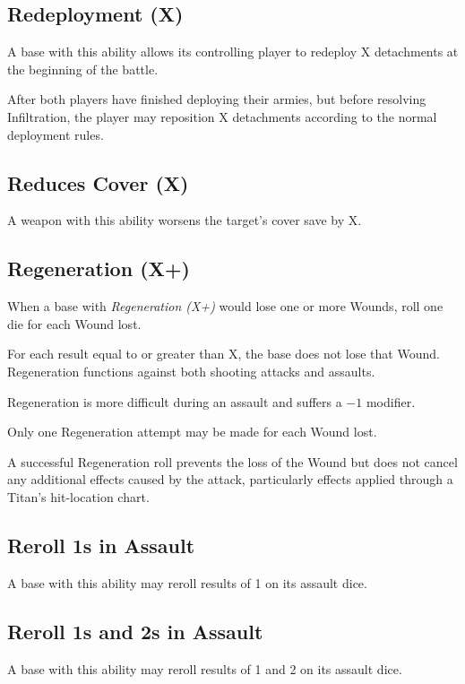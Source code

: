 \subsection{Redeployment (X)}

A base with this ability allows its controlling player to redeploy X detachments at the beginning of the battle.

After both players have finished deploying their armies, but before resolving Infiltration, the player may reposition X detachments according to the normal deployment rules.

\subsection{Reduces Cover (X)}

A weapon with this ability worsens the target's cover save by X.

\subsection{Regeneration (X+)}

When a base with \textit{Regeneration (X+)} would lose one or more Wounds, roll one die for each Wound lost.

For each result equal to or greater than X, the base does not lose that Wound. Regeneration functions against both shooting attacks and assaults.

Regeneration is more difficult during an assault and suffers a $-1$ modifier.

Only one Regeneration attempt may be made for each Wound lost.

A successful Regeneration roll prevents the loss of the Wound but does not cancel any additional effects caused by the attack, particularly effects applied through a Titan's hit-location chart.

\subsection{Reroll 1s in Assault}

A base with this ability may reroll results of 1 on its assault dice.

\subsection{Reroll 1s and 2s in Assault}

A base with this ability may reroll results of 1 and 2 on its assault dice.

